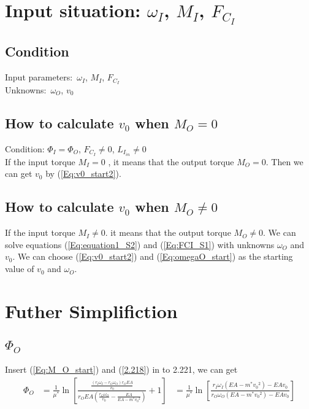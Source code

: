 \documentclass[a4paper,fleqn,13pt]{article}
\begin{document}
\section{Input situation: $\omega_I$, $M_I$, $F_{C_I}$}

\subsection{Condition}
Input parameters:\ $\omega_I$, $M_I$, $F_{C_I}$ \\
Unknowns:\ $\omega_O$, $v_0$

\subsection{How to calculate $v_0$ when $M_O = 0$}
Condition: $\Phi_I=\Phi_O$, $F_{C_I} \not = 0$, $L_{I_{in}} \neq 0$  \\

If the input torque $M_I = 0$ , it means that the output torque $M_O = 0$. Then we can get $v_0$ by (\ref{Eq:v0_start2}).

\subsection{How to calculate $v_0$ when $M_O \not = 0$ }
If the input torque $M_I \neq 0$. it means that the output torque $M_O \neq 0$. We can solve equations (\ref{Eq:equation1_S2}) and (\ref{Eq:FCI_S1}) with unknowns $\omega_O$ and $v_0$.
We can choose (\ref{Eq:v0_start2}) and (\ref{Eq:omegaO_start}) as the starting value of $v_0$ and $\omega_O$.



\newpage
\appendix
\section{Futher Simplifiction}

\subsection{$\Phi_O$}
Insert (\ref{Eq:M_O_start}) and (\ref{2.218}) in to 2.221, we can get
\begin{equation} \label{Eq:PhiO_simpliction}
  \begin{aligned}
  \Phi_O  &= \frac{1}{\mu^*} \ln {\left[\frac{\frac{(r_I\omega_I-r_O\omega_O)r_OEA}{v_0}}{r_OEA(\frac{r_O\omega_O}{v_0}-\frac{EA}{EA-m^*{v_0}^2})} + 1\right]}
	  &= \frac{1}{\mu^*} \ln {\left[\frac{r_I\omega_I(EA-m^*{v_0}^2)-EAv_0}{r_O\omega_O(EA-m^*{v_0}^2)-EAv_0}\right]}
  \end{aligned}
\end{equation}
\end{document}
